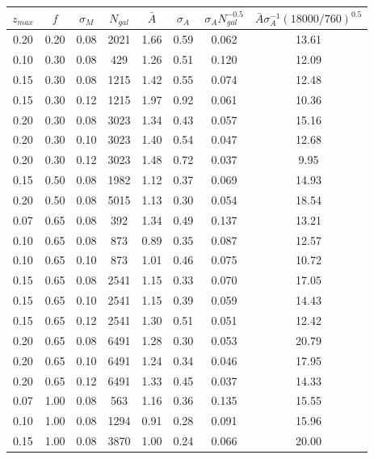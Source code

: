 \documentclass{aastex62}   	%
\begin{document}
\begin{table}
   \centering
   \begin{tabular}{|ccc|ccccc|} %
   \hline
$z_{max}$ & $f$ & $\sigma_{M}$ & $N_{gal}$ & $\bar{A}$ & $\sigma_A$ & $\sigma_A N_{gal}^{-0.5}$ & $\bar{A} \sigma_A^{-1} (18000/760)^{0.5}$ \\
\hline
0.20 & 0.20 & 0.08 & 2021 &   1.66 &   0.59 &  0.062 &  13.61 \\
0.10 & 0.30 & 0.08 & 429 &   1.26 &   0.51 &  0.120 &  12.09 \\
0.15 & 0.30 & 0.08 & 1215 &   1.42 &   0.55 &  0.074 &  12.48 \\
0.15 & 0.30 & 0.12 & 1215 &   1.97 &   0.92 &  0.061 &  10.36 \\
0.20 & 0.30 & 0.08 & 3023 &   1.34 &   0.43 &  0.057 &  15.16 \\
0.20 & 0.30 & 0.10 & 3023 &   1.40 &   0.54 &  0.047 &  12.68 \\
0.20 & 0.30 & 0.12 & 3023 &   1.48 &   0.72 &  0.037 &   9.95 \\
0.15 & 0.50 & 0.08 & 1982 &   1.12 &   0.37 &  0.069 &  14.93 \\
0.20 & 0.50 & 0.08 & 5015 &   1.13 &   0.30 &  0.054 &  18.54 \\
0.07 & 0.65 & 0.08 & 392 &   1.34 &   0.49 &  0.137 &  13.21 \\
0.10 & 0.65 & 0.08 & 873 &   0.89 &   0.35 &  0.087 &  12.57 \\
0.10 & 0.65 & 0.10 & 873 &   1.01 &   0.46 &  0.075 &  10.72 \\
0.15 & 0.65 & 0.08 & 2541 &   1.15 &   0.33 &  0.070 &  17.05 \\
0.15 & 0.65 & 0.10 & 2541 &   1.15 &   0.39 &  0.059 &  14.43 \\
0.15 & 0.65 & 0.12 & 2541 &   1.30 &   0.51 &  0.051 &  12.42 \\
0.20 & 0.65 & 0.08 & 6491 &   1.28 &   0.30 &  0.053 &  20.79 \\
0.20 & 0.65 & 0.10 & 6491 &   1.24 &   0.34 &  0.046 &  17.95 \\
0.20 & 0.65 & 0.12 & 6491 &   1.33 &   0.45 &  0.037 &  14.33 \\
0.07 & 1.00 & 0.08 & 563 &   1.16 &   0.36 &  0.135 &  15.55 \\
0.10 & 1.00 & 0.08 & 1294 &   0.91 &   0.28 &  0.091 &  15.96 \\
0.15 & 1.00 & 0.08 & 3870 &   1.00 &   0.24 &  0.066 &  20.00 \\

\end{tabular}
\end{table}
\end{document}
